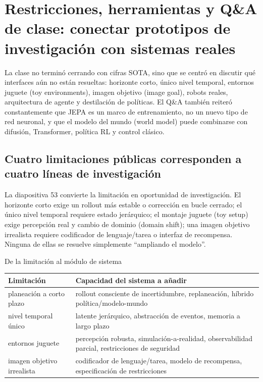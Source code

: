 \section{Restricciones, herramientas y Q\&A de clase: conectar prototipos de investigación con sistemas reales}

La clase no terminó cerrando con cifras SOTA, sino que se centró en discutir qué interfaces aún no están resueltas: horizonte corto, único nivel temporal, entornos juguete (toy environments), imagen objetivo (image goal), robots reales, arquitectura de agente y destilación de políticas. El Q\&A también reiteró constantemente que JEPA es un marco de entrenamiento, no un nuevo tipo de red neuronal, y que el modelo del mundo (world model) puede combinarse con difusión, Transformer, política RL y control clásico.

\subsection{Cuatro limitaciones públicas corresponden a cuatro líneas de investigación}

La diapositiva 53 convierte la limitación en oportunidad de investigación. El horizonte corto exige un rollout más estable o corrección en bucle cerrado; el único nivel temporal requiere estado jerárquico; el montaje juguete (toy setup) exige percepción real y cambio de dominio (domain shift); una imagen objetivo irrealista requiere codificador de lenguaje/tarea o interfaz de recompensa. Ninguna de ellas se resuelve simplemente ``ampliando el modelo''.


\begin{knowledgebox}{De la limitación al módulo de sistema}
\begin{tabularx}{\textwidth}{L{0.24\textwidth} X}
\toprule
Limitación & Capacidad del sistema a añadir \\
\midrule
planeación a corto plazo & rollout consciente de incertidumbre, replaneación, híbrido política/modelo-mundo \\
nivel temporal único & latente jerárquico, abstracción de eventos, memoria a largo plazo \\
entornos juguete & percepción robusta, simulación-a-realidad, observabilidad parcial, restricciones de seguridad \\
imagen objetivo irrealista & codificador de lenguaje/tarea, modelo de recompensa, especificación de restricciones \\
\bottomrule
\end{tabularx}
\end{knowledgebox}

